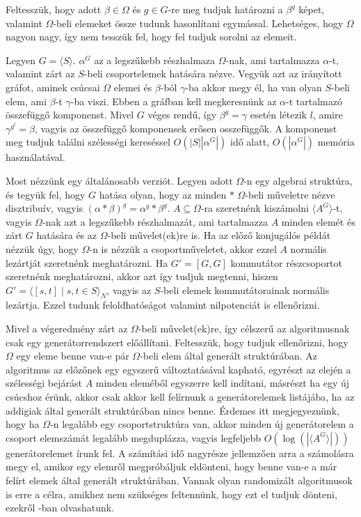 Feltesszük, hogy adott $\beta\in\Omega$ és $g\in G$-re meg tudjuk határozni a $\beta^g$ képet, valamint $\Omega$-beli
elemeket össze tudunk hasonlítani egymással. Lehetséges, hogy $\Omega$ nagyon nagy, így nem tesszük fel, hogy fel tudjuk sorolni az elemeit.

Legyen $G=\langle S\rangle$. $\alpha^G$ az a legszűkebb részhalmaza $\Omega$-nak, ami tartalmazza $\alpha$-t, valamint zárt az $S$-beli csoportelemek hatására nézve.
Vegyük azt az irányított gráfot, aminek csúcsai $\Omega$ elemei és $\beta$-ból $\gamma$-ba akkor megy él, ha van olyan $S$-beli elem, ami $\beta$-t $\gamma$-ba viszi.
Ebben a gráfban kell megkeresnünk az $\alpha$-t tartalmazó összefüggő komponenst.
Mivel $G$ véges rendű, így $\beta^g=\gamma$ esetén létezik $l$, amire $\gamma^{g^l}=\beta$, vagyis az összefüggő komponensek erősen osszefüggők.
A komponenst meg tudjuk találni szélességi kereséssel $O(|S| |\alpha^G|)$ idő alatt, $O(|\alpha^G|)$ memória használatával.

Most nézzünk egy általánosabb verziót.
Legyen adott $\Omega$-n egy algebrai struktúra, és tegyük fel, hogy $G$ hatása olyan, hogy az minden $*$ $\Omega$-beli műveletre nézve disztribuív,
vagyis $(\alpha * \beta)^g = \alpha^g * \beta^g$.
$A \subseteq \Omega$-ra szeretnénk kiszámolni $\langle A^G \rangle$-t, vagyis
$\Omega$-nak azt a legszűkebb részhalmazát, ami tartalmazza $A$ minden elemét és zárt $G$ hatására és az $\Omega$-beli művelet(ek)re is.
Ha az előző konjugálós példát nézzük úgy, hogy $\Omega$-n is nézzük a csoportműveletet, akkor ezzel $A$ normális lezártját szeretnénk meghatározni.
Ha $G'=[G,G]$ kommutátor részcsoportot szeretnénk meghatározni,
akkor azt így tudjuk megtenni, hiszen $G'=\langle[s,t] \mid s,t \in S\rangle_N$, vagyis az $S$-beli elemek kommutátorainak normális lezártja.
Ezzel tudunk feloldhatóságot valamint nilpotenciát is ellenőrizni.

Mivel a végeredmény zárt az $\Omega$-beli művelet(ek)re, így célszerű az algoritmusnak csak egy generátorrendszert előállítani.
Feltesszük, hogy tudjuk ellenőrizni, hogy $\Omega$ egy eleme benne van-e pár $\Omega$-beli elem által generált struktúrában.
Az algoritmus az előzőnek egy egyszerű változtatásával kapható, egyrészt az elején a szélességi bejárást $A$ minden eleméből egyszerre kell indítani,
másrészt ha egy új csúcshoz érünk, akkor csak akkor kell felírnunk a generátorelemek listájába, ha az addigiak által generált struktúrában nincs benne.
Érdemes itt megjegyeznünk, hogy ha $\Omega$-n legalább egy csoportstruktúra van, akkor minden új generátorelem a csoport elemszámát legalább megduplázza,
vagyis legfeljebb $O(\log(|\langle A^G\rangle |))$ generátorelemet írunk fel. A számítási idő nagyrésze jellemzően arra a számolásra megy el, amikor egy elemről
megpróbáljuk eldönteni, hogy benne van-e a már felírt elemek által generált struktúrában. Vannak olyan randomizált algoritmusok is erre a célra, amikhez nem szükséges feltennünk,
hogy ezt el tudjuk dönteni, ezekről \cite{Ser03}-ban olvashatunk.

